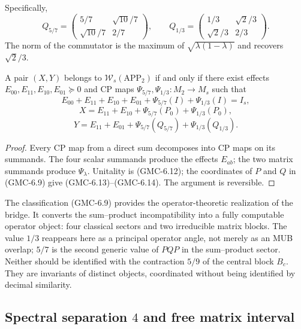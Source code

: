 Specifically,
\[
 Q_{5/7}=
 \begin{pmatrix}5/7&\sqrt{10}/7\\\sqrt{10}/7&2/7\end{pmatrix},
 \qquad
 Q_{1/3}=
 \begin{pmatrix}1/3&\sqrt2/3\\\sqrt2/3&2/3\end{pmatrix}.
 \tag{GMC-6.11}
\]
The norm of the commutator is the maximum of
$\sqrt{\lambda(1-\lambda)}$ and recovers $\sqrt2/3$.

\begin{corollary}
\label{p12-83-c22-s1:gmc:cor:rango-app-d2}
A pair $(X,Y)$ belongs to $\mathcal W_s(\mathrm{APP}_2)$ if and only if
there exist effects
$E_{00},E_{11},E_{10},E_{01}\succeq0$ and CP maps
$\Psi_{5/7},\Psi_{1/3}:M_2\to M_s$ such that
\[
 E_{00}+E_{11}+E_{10}+E_{01}
 +\Psi_{5/7}(I)+\Psi_{1/3}(I)=I_s,
 \tag{GMC-6.12}
\]
\[
 X=E_{11}+E_{10}
 +\Psi_{5/7}(P_0)+\Psi_{1/3}(P_0),
 \tag{GMC-6.13}
\]
\[
 Y=E_{11}+E_{01}
 +\Psi_{5/7}(Q_{5/7})+\Psi_{1/3}(Q_{1/3}).
 \tag{GMC-6.14}
\]
\end{corollary}

\begin{proof}
Every CP map from a direct sum decomposes into CP maps on its
summands. The four scalar summands produce the effects $E_{ab}$; the
two matrix summands produce $\Psi_\lambda$. Unitality is
\textup{(GMC-6.12)}; the coordinates of $P$ and $Q$ in \textup{(GMC-6.9)} give
\textup{(GMC-6.13)}--\textup{(GMC-6.14)}. The argument is reversible.
\end{proof}

\begin{bridgebox}
The classification \textup{(GMC-6.9)} provides the operator-theoretic realization of the bridge. It converts the
sum--product incompatibility into a fully computable operator object:
four classical sectors and two irreducible matrix blocks.
The value $1/3$ reappears here as a principal operator angle, not merely as
an MUB overlap; $5/7$ is the second generic value of $PQP$ in the
sum--product sector. Neither should be identified with the contraction $5/9$ of the
central block $B_c$. They are invariants of distinct objects, coordinated without
being identified by decimal similarity.
\end{bridgebox}

\subsection{Spectral separation \texorpdfstring{$4$}{4} and free matrix interval}

